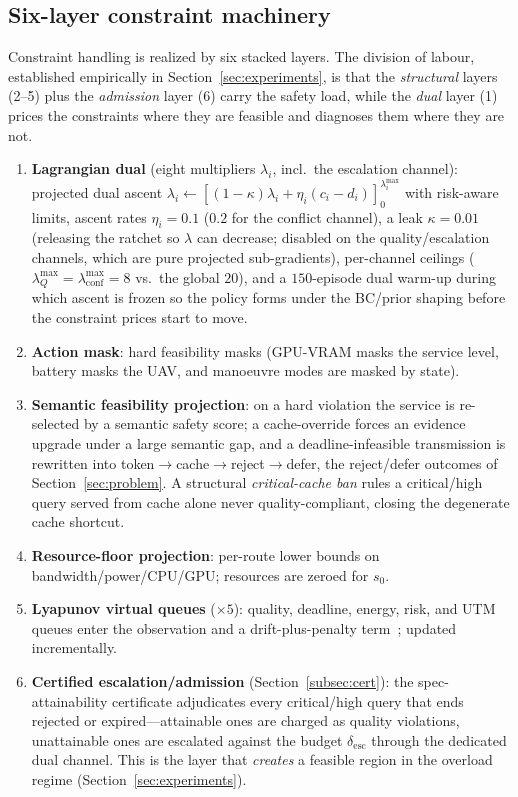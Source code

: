 \subsection{Six-layer constraint machinery}\label{sub:layers}
Constraint handling is realized by six stacked layers. The division of
labour, established empirically in Section~\ref{sec:experiments}, is that
the \emph{structural} layers (2--5) plus the \emph{admission} layer (6)
carry the safety load, while the \emph{dual} layer (1) prices the
constraints where they are feasible and diagnoses them where they are not.
\begin{enumerate}
\item \textbf{Lagrangian dual} (eight multipliers $\lambda_i$, incl.\ the
escalation channel): projected dual ascent
$\lambda_i\!\leftarrow\![(1{-}\kappa)\lambda_i+
\eta_i(c_i-d_i)]_{0}^{\lambda_i^{\max}}$
with risk-aware limits, ascent rates $\eta_i=0.1$ ($0.2$ for the conflict
channel), a leak $\kappa{=}0.01$ (releasing the ratchet so $\lambda$ can
decrease; disabled on the quality/escalation channels, which are pure
projected sub-gradients), per-channel ceilings
($\lambda^{\max}_{Q}{=}\lambda^{\max}_{\mathrm{conf}}{=}8$ vs.\ the global
$20$), and a $150$-episode dual warm-up during which ascent is frozen so
the policy forms under the BC/prior shaping before the constraint prices
start to move.
\item \textbf{Action mask}: hard feasibility masks (GPU-VRAM masks the
service level, battery masks the UAV, and manoeuvre modes are masked by
state).
\item \textbf{Semantic feasibility projection}: on a hard violation the
service is re-selected by a semantic safety score; a cache-override forces
an evidence upgrade under a large semantic gap, and a deadline-infeasible
transmission is rewritten into token$\to$cache$\to$reject$\to$defer, the
reject/defer outcomes of Section~\ref{sec:problem}. A structural
\emph{critical-cache ban} rules a critical/high query served from cache
alone never quality-compliant, closing the degenerate cache shortcut.
\item \textbf{Resource-floor projection}: per-route lower bounds on
bandwidth/power/CPU/GPU; resources are zeroed for $s_0$.
\item \textbf{Lyapunov virtual queues} ($\times5$): quality, deadline,
energy, risk, and UTM queues enter the observation and a drift-plus-penalty
term~\cite{chow2018lyapunov,neely2010stochastic}; updated incrementally.
\item \textbf{Certified escalation/admission} (Section~\ref{subsec:cert}):
the spec-attainability certificate adjudicates every critical/high query
that ends rejected or expired---attainable ones are charged as quality
violations, unattainable ones are escalated against the budget
$\delta_{\mathrm{esc}}$ through the dedicated dual channel. This is the
layer that \emph{creates} a feasible region in the overload regime
(Section~\ref{sec:experiments}).
\end{enumerate}

